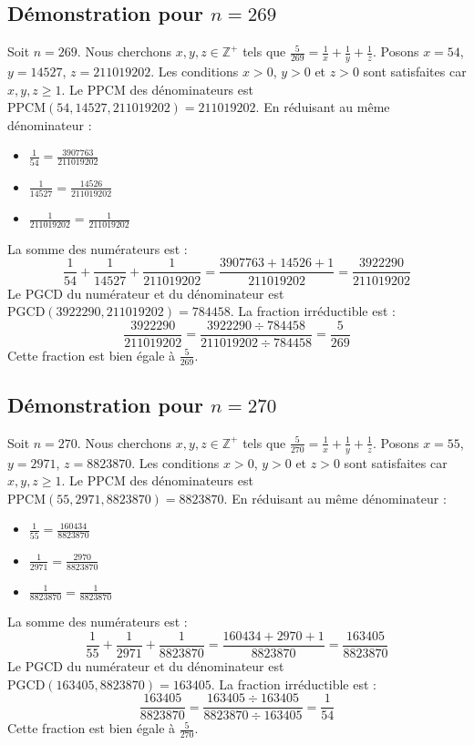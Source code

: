 \documentclass[11pt,a4paper]{article}
\begin{document}
\subsection{Démonstration pour $n = 269$}
Soit $n = 269$. Nous cherchons $x, y, z \in \mathbb{Z}^{+}$ tels que $\frac{5}{269} = \frac{1}{x} + \frac{1}{y} + \frac{1}{z}$.
Posons $x = 54$, $y = 14527$, $z = 211019202$.
Les conditions $x > 0$, $y > 0$ et $z > 0$ sont satisfaites car $x, y, z \geq 1$.
Le PPCM des dénominateurs est $\text{PPCM}(54, 14527, 211019202) = 211019202$.
En réduisant au même dénominateur :
\begin{itemize}
    \item $\frac{1}{54} = \frac{3907763}{211019202}$
    \item $\frac{1}{14527} = \frac{14526}{211019202}$
    \item $\frac{1}{211019202} = \frac{1}{211019202}$
\end{itemize}
La somme des numérateurs est :
$$ \frac{1}{54} + \frac{1}{14527} + \frac{1}{211019202} = \frac{3907763 + 14526 + 1}{211019202} = \frac{3922290}{211019202} $$
Le PGCD du numérateur et du dénominateur est $\text{PGCD}(3922290, 211019202) = 784458$.
La fraction irréductible est :
$$ \frac{3922290}{211019202} = \frac{3922290 \div 784458}{211019202 \div 784458} = \frac{5}{269} $$
Cette fraction est bien égale à $\frac{5}{269}$.

\subsection{Démonstration pour $n = 270$}
Soit $n = 270$. Nous cherchons $x, y, z \in \mathbb{Z}^{+}$ tels que $\frac{5}{270} = \frac{1}{x} + \frac{1}{y} + \frac{1}{z}$.
Posons $x = 55$, $y = 2971$, $z = 8823870$.
Les conditions $x > 0$, $y > 0$ et $z > 0$ sont satisfaites car $x, y, z \geq 1$.
Le PPCM des dénominateurs est $\text{PPCM}(55, 2971, 8823870) = 8823870$.
En réduisant au même dénominateur :
\begin{itemize}
    \item $\frac{1}{55} = \frac{160434}{8823870}$
    \item $\frac{1}{2971} = \frac{2970}{8823870}$
    \item $\frac{1}{8823870} = \frac{1}{8823870}$
\end{itemize}
La somme des numérateurs est :
$$ \frac{1}{55} + \frac{1}{2971} + \frac{1}{8823870} = \frac{160434 + 2970 + 1}{8823870} = \frac{163405}{8823870} $$
Le PGCD du numérateur et du dénominateur est $\text{PGCD}(163405, 8823870) = 163405$.
La fraction irréductible est :
$$ \frac{163405}{8823870} = \frac{163405 \div 163405}{8823870 \div 163405} = \frac{1}{54} $$
Cette fraction est bien égale à $\frac{5}{270}$.
\end{document}
